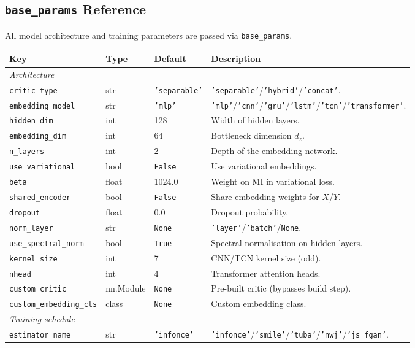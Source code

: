 \documentclass[12pt]{article}
\newcommand{\api}[1]{\texttt{#1}}
\begin{document}
\subsection{\texttt{base\_params} Reference}

All model architecture and training parameters are passed via \api{base\_params}.

\begin{center}
\small
\begin{tabular}{lllp{6.5cm}}
\toprule
\textbf{Key} & \textbf{Type} & \textbf{Default} & \textbf{Description} \\
\midrule
\multicolumn{4}{l}{\textit{Architecture}} \\
\api{critic\_type} & str & \api{'separable'} & \api{'separable'}/\api{'hybrid'}/\api{'concat'}. \\
\api{embedding\_model} & str & \api{'mlp'} & \api{'mlp'}/\api{'cnn'}/\api{'gru'}/\api{'lstm'}/\api{'tcn'}/\api{'transformer'}. \\
\api{hidden\_dim} & int & 128 & Width of hidden layers. \\
\api{embedding\_dim} & int & 64 & Bottleneck dimension $d_z$. \\
\api{n\_layers} & int & 2 & Depth of the embedding network. \\
\api{use\_variational} & bool & \api{False} & Use variational embeddings. \\
\api{beta} & float & 1024.0 & Weight on MI in variational loss. \\
\api{shared\_encoder} & bool & \api{False} & Share embedding weights for $X$/$Y$. \\
\api{dropout} & float & 0.0 & Dropout probability. \\
\api{norm\_layer} & str & \api{None} & \api{'layer'}/\api{'batch'}/\api{None}. \\
\api{use\_spectral\_norm} & bool & \api{True} & Spectral normalisation on hidden layers. \\
\api{kernel\_size} & int & 7 & CNN/TCN kernel size (odd). \\
\api{nhead} & int & 4 & Transformer attention heads. \\
\api{custom\_critic} & nn.Module & \api{None} & Pre-built critic (bypasses build step). \\
\api{custom\_embedding\_cls} & class & \api{None} & Custom embedding class. \\
\midrule
\multicolumn{4}{l}{\textit{Training schedule}} \\
\api{estimator\_name} & str & \api{'infonce'} & \api{'infonce'}/\api{'smile'}/\api{'tuba'}/\api{'nwj'}/\api{'js\_fgan'}. \\

\end{tabular}
\end{center}
\end{document}
